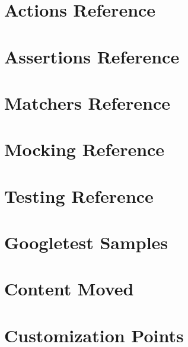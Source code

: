 \let\mypdfximage\pdfximage\def\pdfximage{\immediate\mypdfximage}\documentclass[twoside]{book}
\newcommand{\+}{\discretionary{\mbox{\scriptsize$\hookleftarrow$}}{}{}}
\begin{document}
\chapter{Actions Reference}
\label{md_googletest_docs_reference_actions}

\chapter{Assertions Reference}
\label{md_googletest_docs_reference_assertions}

\chapter{Matchers Reference}
\label{md_googletest_docs_reference_matchers}

\chapter{Mocking Reference}
\label{md_googletest_docs_reference_mocking}

\chapter{Testing Reference}
\label{md_googletest_docs_reference_testing}

\chapter{Googletest Samples}
\label{md_googletest_docs_samples}

\chapter{Content Moved}
\label{md_googletest_googlemock_docs_README}

\chapter{Customization Points}
\label{md_googletest_googlemock_include_gmock_internal_custom_README}

\end{document}
